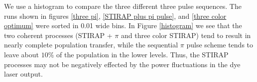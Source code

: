 We use a histogram to compare the three different three pulse sequences. The runs shown in figures \ref{three pi}, \ref{STIRAP plus pi pulse}, and \ref{three color optimum} were sorted in 0.01 wide bins. In Figure \ref{histogram} we see that the two coherent processes (STIRAP + $\pi$ and three color STIRAP) tend to result in nearly complete population transfer, while the sequential $\pi$ pulse scheme tends to leave about $10\%$ of the population in the lower levels. Thus, the STIRAP processes may not be negatively effected by the power fluctuations in the dye laser output.

